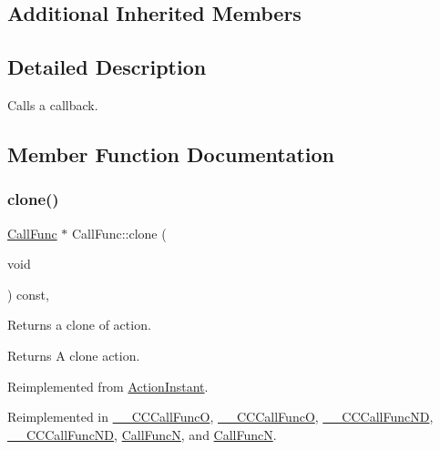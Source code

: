 \subsection*{Additional Inherited Members}


\subsection{Detailed Description}
Calls a \textquotesingle{}callback\textquotesingle{}. 

\subsection{Member Function Documentation}
\mbox{\label{classCallFunc_a87c2d0fecf4d8ae9d4b58a28e594daf0}} 
\subsubsection{\texorpdfstring{clone()}{clone()}\hspace{0.1cm}{\footnotesize\ttfamily [1/2]}}
{\footnotesize\ttfamily \hyperlink{classCallFunc}{Call\+Func} $\ast$ Call\+Func\+::clone (\begin{DoxyParamCaption}\item[{void}]{ }\end{DoxyParamCaption}) const\hspace{0.3cm}{\ttfamily [override]}, {\ttfamily [virtual]}}

Returns a clone of action.

\begin{DoxyReturn}{Returns}
A clone action. 
\end{DoxyReturn}


Reimplemented from \hyperlink{classActionInstant_adb76fc6f006098109e8256210cbd8cc0}{Action\+Instant}.



Reimplemented in \hyperlink{class____CCCallFuncO_a83119c4b99a7f866556d0e2945ebd61b}{\+\_\+\+\_\+\+C\+C\+Call\+FuncO}, \hyperlink{class____CCCallFuncO_ae01d43dd90e3052c278e1431097c2b2e}{\+\_\+\+\_\+\+C\+C\+Call\+FuncO}, \hyperlink{class____CCCallFuncND_a1c4550d2841e8c7469f2831bedfa2726}{\+\_\+\+\_\+\+C\+C\+Call\+Func\+ND}, \hyperlink{class____CCCallFuncND_a0b1d35734a49b6c12144e4b025fe84eb}{\+\_\+\+\_\+\+C\+C\+Call\+Func\+ND}, \hyperlink{classCallFuncN_aad41687c463cb5d6e9a5879b0dd8b1e3}{Call\+FuncN}, and \hyperlink{classCallFuncN_a0284c35f23aa8b68bc921eb044b6dd54}{Call\+FuncN}.

